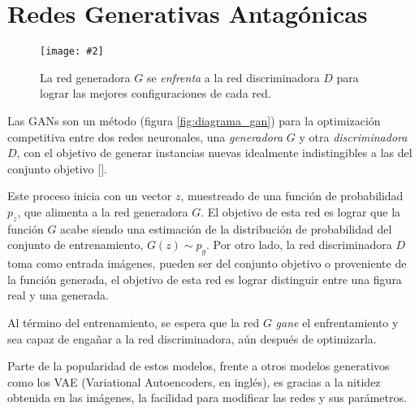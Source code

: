 \documentclass[letterpaper,12pt,oneside]{book}
\newcommand{\figura}[4]{
          \begin{figure}[H]
            \centering
            \texttt{[image: \#2]}
            \caption{#3}
            \label{#4}
          \end{figure}
                            }
\begin{document}

                \section{Redes Generativas Antagónicas}

                \figura{0.45}{Imagenes/Resultados/gan_vs.png}{La red generadora $G$ se {\it enfrenta} a la red discriminadora $D$ para lograr las mejores configuraciones de cada red.}{fig:gan_vs}

                Las GANs son un método (figura \ref{fig:diagrama_gan}) para la optimización competitiva entre dos redes neuronales, una {\it generadora} $G$ y otra {\it discriminadora} $D$, con el objetivo de generar instancias nuevas idealmente indistingibles a las del conjunto objetivo [\cite{de2023redes}].

                Este proceso inicia con un vector $z$, muestreado de una función de probabilidad $p_z$, que alimenta a la red generadora $G$. El objetivo de esta red es lograr que la función $G$ acabe siendo una estimación de la distribución de probabilidad del conjunto de entrenamiento, $G(z) \sim p_g$. Por otro lado, la red discriminadora $D$ toma como entrada imágenes, pueden ser del conjunto objetivo o proveniente de la función generada, el objetivo de esta red es lograr distinguir entre una figura real y una generada.

                Al término del entrenamiento, se espera que la red $G$ {\it gane} el enfrentamiento y sea capaz de engañar a la red discriminadora, aún después de optimizarla. 

                Parte de la popularidad de estos modelos, frente a otros modelos generativos como los VAE (Variational Autoencoders, en inglés), es gracias a la nitidez obtenida en las imágenes, la facilidad para modificar las redes y sus parámetros. 
                    
\end{document}
